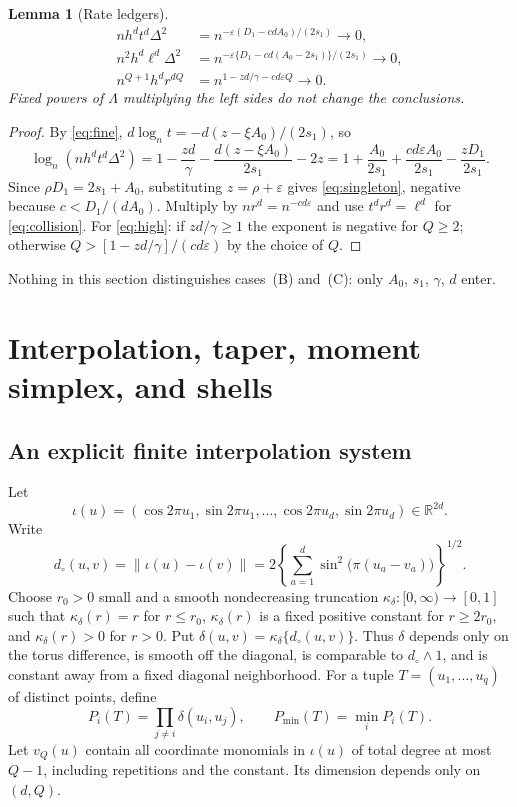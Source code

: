 \documentclass[11pt]{article}
\newtheorem{lemma}[lemma]{Lemma}
\newcommand{\R}{\mathbb{R}}
\newcommand{\norm}[1]{\lVert #1\rVert}
\begin{document}
\begin{lemma}[Rate ledgers]\label{lem:ledgers}
\begin{align}
 nh^dt^d\Delta^2&=n^{-\varepsilon(D_1-cdA_0)/(2s_1)}\to0,
 \label{eq:singleton}\\
 n^2h^d\ell^d\Delta^2&=n^{-\varepsilon\{D_1-cd(A_0-2s_1)\}/(2s_1)}\to0,
 \label{eq:collision}\\
 n^{Q+1}h^dr^{dQ}&=n^{1-zd/\gamma-cd\varepsilon Q}\to0.
 \label{eq:high}
\end{align}
Fixed powers of \(\Lambda\) multiplying the left sides do not change the
conclusions.
\end{lemma}

\begin{proof}
By \eqref{eq:fine}, \(d\log_nt=-d(z-\xi A_0)/(2s_1)\), so
\[
 \log_n(nh^dt^d\Delta^2)=1-\frac{zd}\gamma-\frac{d(z-\xi A_0)}{2s_1}-2z
 =1+\frac{A_0}{2s_1}+\frac{cd\varepsilon A_0}{2s_1}-\frac{zD_1}{2s_1}.
\]
Since \(\rho D_1=2s_1+A_0\), substituting \(z=\rho+\varepsilon\) gives
\eqref{eq:singleton}, negative because \(c<D_1/(dA_0)\).  Multiply by
\(nr^d=n^{-cd\varepsilon}\) and use \(t^dr^d=\ell^d\) for
\eqref{eq:collision}.  For \eqref{eq:high}: if \(zd/\gamma\ge1\) the
exponent is negative for \(Q\ge2\); otherwise
\(Q>[1-zd/\gamma]/(cd\varepsilon)\) by the choice of \(Q\).
\end{proof}
Nothing in this section distinguishes cases~(B) and~(C): only \(A_0\), \(s_1\),
\(\gamma\), \(d\) enter.

\section{Interpolation, taper, moment simplex, and shells}\label{sec:torus}

\subsection{An explicit finite interpolation system}

Let
\[
 \iota(u)=(\cos 2\pi u_1,\sin 2\pi u_1,\ldots,
           \cos 2\pi u_d,\sin 2\pi u_d)\in\R^{2d}.
\]
Write
\[
 d_{\circ}(u,v)=\norm{\iota(u)-\iota(v)}
 =2\left\{\sum_{a=1}^d\sin^2\!\bigl(\pi(u_a-v_a)\bigr)\right\}^{1/2}.
\]
Choose \(r_0>0\) small and a smooth nondecreasing truncation
\(\kappa_\delta:[0,\infty)\to[0,1]\) such that
\(\kappa_\delta(r)=r\) for \(r\le r_0\),
\(\kappa_\delta(r)\) is a fixed positive constant for \(r\ge2r_0\), and
\(\kappa_\delta(r)>0\) for \(r>0\).  Put
\(\delta(u,v)=\kappa_\delta\{d_{\circ}(u,v)\}\).  Thus \(\delta\) depends
only on the torus difference, is smooth off the diagonal, is comparable to
\(d_{\circ}\wedge1\), and is constant away from a fixed diagonal
neighborhood.  For a tuple \(T=(u_1,\ldots,u_q)\) of distinct points, define
\begin{equation}
 P_i(T)=\prod_{j\ne i}\delta(u_i,u_j),
 \qquad
 P_{\min}(T)=\min_iP_i(T).
 \label{eq:product-distance}
\end{equation}
Let \(v_Q(u)\) contain all coordinate monomials in \(\iota(u)\) of total
degree at most \(Q-1\), including repetitions and the constant.  Its dimension depends only on
\((d,Q)\).
\end{document}

